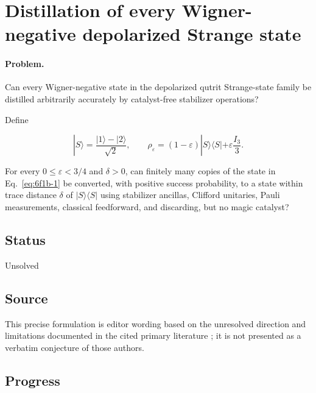 \section{Distillation of every Wigner-negative depolarized Strange state}
\label{sec:op_6f1b7742387af9e7}

\paragraph{Problem.}
Can every Wigner-negative state in the depolarized qutrit Strange-state family be distilled arbitrarily accurately by catalyst-free stabilizer operations?

Define

\begin{equation}
|S\rangle=\frac{|1\rangle-|2\rangle}{\sqrt2},
\qquad
\rho_\varepsilon=(1-\varepsilon)|S\rangle\langle S|+\varepsilon\frac{I_3}{3}.
\label{eq:6f1b-1}
\end{equation}

For every $0\leq\varepsilon<3/4$ and $\delta>0$, can finitely many copies of the state in Eq.~\eqref{eq:6f1b-1} be converted, with positive success probability, to a state within trace distance $\delta$ of $|S\rangle\langle S|$ using stabilizer ancillas, Clifford unitaries, Pauli measurements, classical feedforward, and discarding, but no magic catalyst?

\subsection*{Status}

Unsolved

\subsection*{Source}

This precise formulation is editor wording based on the unresolved direction and limitations documented in the cited primary literature ; it is not presented as a verbatim conjecture of those authors.

\subsection*{Progress}

